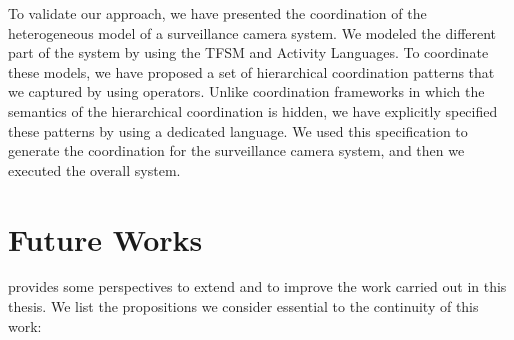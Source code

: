 To validate our approach, we have presented the coordination of the heterogeneous model of a surveillance camera system. We modeled the different part of the system by using the TFSM and Activity Languages. To coordinate these models, we have proposed a set of hierarchical coordination patterns that we captured by using \bcool operators. Unlike coordination frameworks in which the semantics of the hierarchical coordination is hidden, we have explicitly specified these patterns by using a dedicated language. We used this specification to generate the coordination for the surveillance camera system, and then we executed the overall system.


	  
\section{Future Works}
\bcool provides some perspectives to extend and to improve the work carried out in this thesis. We list the propositions we consider essential to the continuity of this work:

